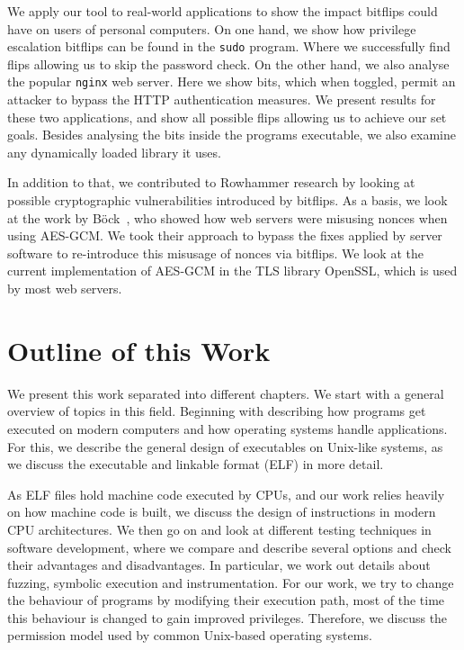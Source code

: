 We apply our tool to real-world applications to show the impact bitflips could
have on users of personal computers. On one hand, we show how privilege
escalation bitflips can be found in the \texttt{sudo} program. Where we
successfully find flips allowing us to skip the password check. On the other
hand, we also analyse the popular \texttt{nginx} web server. Here we show bits,
which when toggled, permit an attacker to bypass the HTTP authentication
measures. We present results for these two applications, and show all possible
flips allowing us to achieve our set goals. Besides analysing the bits inside
the program\textquotesingle s executable, we also examine any dynamically loaded
library it uses.

In addition to that, we contributed to Rowhammer research by looking at possible
cryptographic vulnerabilities introduced by bitflips. As a basis, we look at the
work by Böck~\etal\cite{gcmnonceattack}, who showed how web servers were
misusing nonces when using AES-GCM. We took their approach to bypass the fixes
applied by server software to re-introduce this misusage of nonces via bitflips.
We look at the current implementation of AES-GCM in the TLS library OpenSSL,
which is used by most web servers.

\section{Outline of this Work}

We present this work separated into different chapters. We start with a general
overview of topics in this field. Beginning with describing how programs get
executed on modern computers and how operating systems handle applications. For
this, we describe the general design of executables on Unix-like systems, as we
discuss the executable and linkable format (ELF) in more detail.

As ELF files hold machine code executed by CPUs, and our work relies heavily on
how machine code is built, we discuss the design of instructions in modern
CPU architectures.  We then go on and look at different testing techniques in
software development, where we compare and describe several options and check
their advantages and disadvantages. In particular, we work out details about
fuzzing, symbolic execution and instrumentation. For our work, we try to change
the behaviour of programs by modifying their execution path, most of the time
this behaviour is changed to gain improved privileges. Therefore, we discuss the
permission model used by common Unix-based operating systems.

